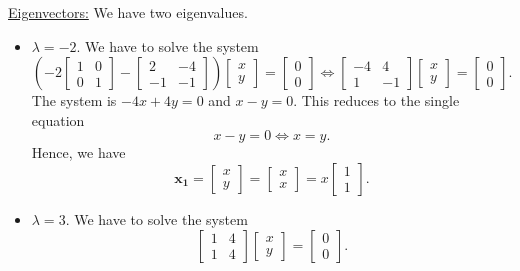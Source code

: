 \documentclass[12pt]{article}
\begin{document}
		\underline{Eigenvectors:} We have two eigenvalues.
			\begin{itemize}
				\item $\lambda = -2$. We have to solve the system
					\[
						\left( -2 \begin{bmatrix} 1 & 0 \\ 0 & 1 \end{bmatrix} - \begin{bmatrix} 2 & -4 \\ -1 & -1 \end{bmatrix} \right) \begin{bmatrix} x \\ y \end{bmatrix} = \begin{bmatrix} 0 \\ 0 \end{bmatrix} \iff \begin{bmatrix} -4 & 4 \\ 1 & -1 \end{bmatrix} \begin{bmatrix} x \\ y \end{bmatrix} = \begin{bmatrix} 0 \\ 0 \end{bmatrix} .
					\]
				The system is $-4x + 4y = 0$ and $x - y = 0$. This reduces to the single equation
					\[
						x - y = 0 \iff x = y .
					\]
				Hence, we have
					\[
						\mathbf{x_1} = \begin{bmatrix} x \\ y \end{bmatrix} = \begin{bmatrix} x \\ x \end{bmatrix} = x \begin{bmatrix} 1 \\ 1 \end{bmatrix} .
					\]
				\item $\lambda = 3$. We have to solve the system
					\[
						\begin{bmatrix} 1 & 4 \\ 1 & 4 \end{bmatrix} \begin{bmatrix} x \\ y \end{bmatrix} = \begin{bmatrix} 0 \\ 0 \end{bmatrix} .
\]
\end{itemize}
\end{document}

